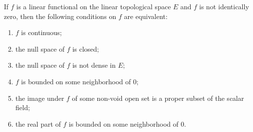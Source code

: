 If $f$ is a linear functional on the linear topological space $E$ and $f$ is not identically zero, then the following conditions on $f$ are equivalent:
\begin{enumerate}
\item[(i)] $f$ is continuous;
\item[(ii)] the null space of $f$ is closed;
\item[(iii)] the null space of $f$ is not dense in $E$;
\item[(iv)] $f$ is bounded on some neighborhood of $0$;
\item[(v)] the image under $f$ of some non-void open set is a proper subset of the scalar field;
\item[(vi)] the real part of $f$ is bounded on some neighborhood of $0$.
\end{enumerate}
